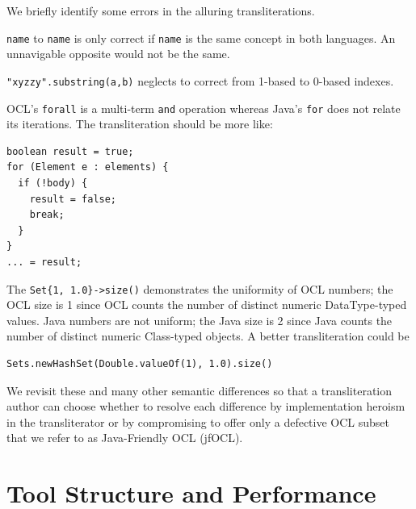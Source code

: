 \documentclass[sigconf]{acmart}
\begin{document}
We briefly identify some errors in the alluring transliterations.

\verb|name| to \verb|name| is only correct if \verb|name| is the same concept in both languages. An unnavigable opposite would not be the same.

\verb|"xyzzy".substring(a,b)| neglects to correct from 1-based to 0-based indexes.

OCL's \verb|forall| is a multi-term \verb|and| operation whereas Java's \verb|for| does not relate its iterations. The transliteration should be more like:

\begin{verbatim}
boolean result = true;
for (Element e : elements) {
  if (!body) {
    result = false;
    break;
  }
}
... = result;
\end{verbatim} 

The \verb|Set{1, 1.0}->size()| demonstrates the uniformity of OCL numbers; the OCL size is 1 since OCL counts the number of distinct numeric DataType-typed  values. Java numbers are not uniform; the Java size is 2 since Java counts the number of distinct numeric Class-typed objects. A better transliteration could be

\begin{verbatim}
Sets.newHashSet(Double.valueOf(1), 1.0).size()
\end{verbatim} 

We revisit these and many other semantic differences so that a transliteration author can choose whether to resolve each difference by implementation heroism in the transliterator or by compromising to offer only a defective OCL subset that we refer to as Java-Friendly OCL (jfOCL).





\section{Tool Structure and Performance}\label{Tool Structure}
\end{document}
